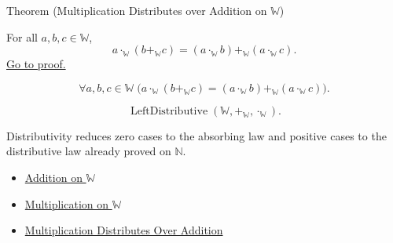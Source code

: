 \begin{theorembox}{Theorem (Multiplication Distributes over Addition on \texorpdfstring{$\mathbb{W}$}{W})}
\begin{theorem}
\label{thm:multiplication-distributes-over-addition-on-w}
For all $a,b,c\in\mathbb{W}$,
\[
a\cdot_{\mathbb{W}}(b+_{\mathbb{W}}c)
=
(a\cdot_{\mathbb{W}}b)+_{\mathbb{W}}(a\cdot_{\mathbb{W}}c).
\]
\hyperref[prf:multiplication-distributes-over-addition-on-w]{Go to proof.}
\end{theorem}
\end{theorembox}

\begin{remark*}
\[
\forall a,b,c\in\mathbb{W}\;
\bigl(a\cdot_{\mathbb{W}}(b+_{\mathbb{W}}c)
=(a\cdot_{\mathbb{W}}b)+_{\mathbb{W}}(a\cdot_{\mathbb{W}}c)\bigr).
\]
\end{remark*}

\begin{remark*}
\[
\operatorname{LeftDistributive}(\mathbb{W},+_{\mathbb{W}},\cdot_{\mathbb{W}}).
\]
\end{remark*}

\begin{remark*}[Interpretation]
Distributivity reduces zero cases to the absorbing law and positive cases to
the distributive law already proved on $\mathbb{N}$.
\end{remark*}

\begin{dependencies}
\begin{itemize}
  \item \hyperref[def:addition-on-w]{Addition on $\mathbb{W}$}
  \item \hyperref[def:multiplication-on-w]{Multiplication on $\mathbb{W}$}
  \item \hyperref[thm:multiplication-distributes-over-addition]{Multiplication Distributes Over Addition}
\end{itemize}
\end{dependencies}
